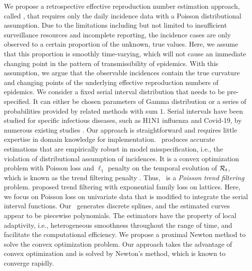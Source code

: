 We propose a retrospective effective reproduction number estimation approach, called \RtEstim, that requires only the daily incidence data with a Poisson distributional assumption. Due to the limitations including but not limited to insufficient surveillance resources and incomplete reporting, the incidence cases are only observed to a certain proportion of the unknown, true values. Here, we assume that this proportion is smoothly time-varying, which will not cause an immediate changing point in the pattern of transmissibility of epidemics. With this assumption, we argue that the observable incidences contain the true curvature and changing points of the underlying effective reproduction numbers of epidemics. We consider a fixed serial interval distribution that needs to be pre-specified. It can either be chosen parameters of Gamma distribution or a series of probabilities provided by related methods with sum $1$. Serial intervals have been studied for specific infectious diseases, such as H1N1 influenza and Covid-19, by numerous existing studies \citep{white2009estimation,boelle2011transmission,rai2021estimates,alene2021serial,griffin2020rapid}. 
Our approach is straightforward and requires little expertise in domain knowledge for implementation. \RtEstim\ produces accurate estimations that are empirically robust in model misspecification, i.e., the violation of distributional assumption of incidences. 
% 
It is a convex optimization problem with Poisson loss and $\ell_1$ penalty on the temporal evolution of $\mathcal{R}_t$, which is known as the trend filtering penalty \citep{kim2009ell_1,tibshirani2014adaptive,sadhanala2022exponential}. Thus, \RtEstim\ is a \textit{Poisson trend filtering} problem. \cite{sadhanala2022exponential} proposed trend filtering with exponential family loss on lattices. Here, we focus on Poisson loss on univariate data that is modified to integrate the serial interval functions. Our \RtEstim\ generates discrete splines, and the estimated curves appear to be piecewise polynomials. The estimators have the property of local adaptivity, i.e., heterogeneous smoothness throughout the range of time, and facilitate the computational efficiency. %
We propose a proximal Newton method to solve the convex optimization problem. Our approach takes the advantage of convex optimization and is solved by Newton's method, which is known to converge rapidly. %
